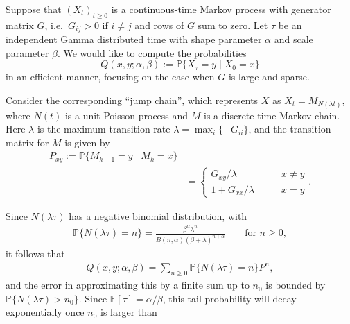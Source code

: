 \documentclass{article}
\newcommand{\E}{\mathbb{E}}
\renewcommand{\P}{\mathbb{P}}
\newcommand{\given}{\;\vert\;}
\newcommand{\Beta}{B}
\begin{document}
Suppose that $(X_t)_{t\ge0}$ is a continuous-time Markov process with generator matrix $G$,
i.e.\ $G_{ij}>0$ if $i\neq j$ and rows of $G$ sum to zero.
Let $\tau$ be an independent Gamma distributed time with shape parameter $\alpha$ and scale parameter $\beta$.
We would like to compute the probabilities
\[
  Q(x,y;\alpha,\beta) := \P\{ X_\tau = y \given X_0 = x \} 
\]
in an efficient manner,
focusing on the case when $G$ is large and sparse.

Consider the corresponding ``jump chain'',
which represents $X$ as $X_t = M_{N(\lambda t)}$,
where $N(t)$ is a unit Poisson process and $M$ is a discrete-time Markov chain.
Here $\lambda$ is the maximum transition rate $\lambda = \max_i \{ - G_{ii} \}$,
and the transition matrix for $M$ is given by
\begin{align}
    P_{xy} := \P\{M_{k+1} = y \given M_k = x\} \\
        &= \begin{cases}  
                G_{xy}/\lambda \qquad & x\neq y \\
                1+G_{xx}/\lambda \qquad & x=y 
            \end{cases} .
\end{align}

Since $N(\lambda \tau)$ has a negative binomial distribution,
with 
\begin{align}
    \P\{ N(\lambda \tau) = n \} = \frac{ \beta^\alpha \lambda^n }{ \Beta(n,\alpha) (\beta+\lambda)^{n+\alpha} }  \qquad \text{for } n \ge 0 ,
\end{align}
it follows that
\begin{align}
    Q(x,y;\alpha,\beta) = \sum_{n \ge 0} \P\{ N(\lambda \tau) = n \} P^n  ,
\end{align}
and the error in approximating this by a finite sum up to $n_0$ is bounded by $\P\{N(\lambda \tau)>n_0\}$.
Since $\E[\tau] = \alpha/\beta$, this tail probability will decay exponentially once $n_0$ is larger than 
\end{document}
